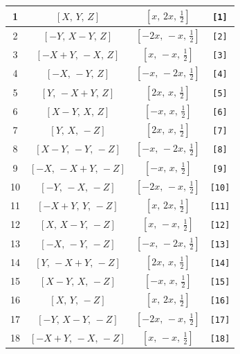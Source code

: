 \documentclass[fleqn,8pt]{jsarticle}
\begin{document}
\begin{longtable}{cccc}
1 & $\left[ X,\, Y,\, Z \right]$ & $\left[ x,\, 2 x,\, \frac{1}{2} \right]$ & {\tt [1]} \\ \hline
2 & $\left[ - Y,\, X - Y,\, Z \right]$ & $\left[ - 2 x,\, - x,\, \frac{1}{2} \right]$ & {\tt [2]} \\ \hline
3 & $\left[ - X + Y,\, - X,\, Z \right]$ & $\left[ x,\, - x,\, \frac{1}{2} \right]$ & {\tt [3]} \\ \hline
4 & $\left[ - X,\, - Y,\, Z \right]$ & $\left[ - x,\, - 2 x,\, \frac{1}{2} \right]$ & {\tt [4]} \\ \hline
5 & $\left[ Y,\, - X + Y,\, Z \right]$ & $\left[ 2 x,\, x,\, \frac{1}{2} \right]$ & {\tt [5]} \\ \hline
6 & $\left[ X - Y,\, X,\, Z \right]$ & $\left[ - x,\, x,\, \frac{1}{2} \right]$ & {\tt [6]} \\ \hline
7 & $\left[ Y,\, X,\, - Z \right]$ & $\left[ 2 x,\, x,\, \frac{1}{2} \right]$ & {\tt [7]} \\ \hline
8 & $\left[ X - Y,\, - Y,\, - Z \right]$ & $\left[ - x,\, - 2 x,\, \frac{1}{2} \right]$ & {\tt [8]} \\ \hline
9 & $\left[ - X,\, - X + Y,\, - Z \right]$ & $\left[ - x,\, x,\, \frac{1}{2} \right]$ & {\tt [9]} \\ \hline
10 & $\left[ - Y,\, - X,\, - Z \right]$ & $\left[ - 2 x,\, - x,\, \frac{1}{2} \right]$ & {\tt [10]} \\ \hline
11 & $\left[ - X + Y,\, Y,\, - Z \right]$ & $\left[ x,\, 2 x,\, \frac{1}{2} \right]$ & {\tt [11]} \\ \hline
12 & $\left[ X,\, X - Y,\, - Z \right]$ & $\left[ x,\, - x,\, \frac{1}{2} \right]$ & {\tt [12]} \\ \hline
13 & $\left[ - X,\, - Y,\, - Z \right]$ & $\left[ - x,\, - 2 x,\, \frac{1}{2} \right]$ & {\tt [13]} \\ \hline
14 & $\left[ Y,\, - X + Y,\, - Z \right]$ & $\left[ 2 x,\, x,\, \frac{1}{2} \right]$ & {\tt [14]} \\ \hline
15 & $\left[ X - Y,\, X,\, - Z \right]$ & $\left[ - x,\, x,\, \frac{1}{2} \right]$ & {\tt [15]} \\ \hline
16 & $\left[ X,\, Y,\, - Z \right]$ & $\left[ x,\, 2 x,\, \frac{1}{2} \right]$ & {\tt [16]} \\ \hline
17 & $\left[ - Y,\, X - Y,\, - Z \right]$ & $\left[ - 2 x,\, - x,\, \frac{1}{2} \right]$ & {\tt [17]} \\ \hline
18 & $\left[ - X + Y,\, - X,\, - Z \right]$ & $\left[ x,\, - x,\, \frac{1}{2} \right]$ & {\tt [18]} \\ \hline

\end{longtable}
\end{document}
